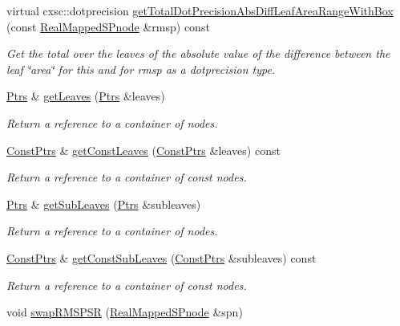 \begin{DoxyCompactItemize}
virtual cxsc\-::dotprecision \hyperlink{classsubpavings_1_1RealMappedSPnode_a74ba255a0781497c5dc76e8458969278}{get\-Total\-Dot\-Precision\-Abs\-Diff\-Leaf\-Area\-Range\-With\-Box} (const \hyperlink{classsubpavings_1_1RealMappedSPnode}{\-Real\-Mapped\-S\-Pnode} \&rmsp) const 
\begin{DoxyCompactList}\small\item\em \-Get the total over the leaves of the absolute value of the difference between the leaf \char`\"{}area\char`\"{} for this and for {\itshape rmsp\/} as a dotprecision type. \end{DoxyCompactList}\item 
\hyperlink{classsubpavings_1_1RealMappedSPnode_a9591975c77c7e7da92bbdcdf62a74d1a}{\-Ptrs} \& \hyperlink{classsubpavings_1_1RealMappedSPnode_a866601879aed0044333a5f28a773f677}{get\-Leaves} (\hyperlink{classsubpavings_1_1RealMappedSPnode_a9591975c77c7e7da92bbdcdf62a74d1a}{\-Ptrs} \&leaves)
\begin{DoxyCompactList}\small\item\em \-Return a reference to a container of nodes. \end{DoxyCompactList}\item 
\hyperlink{classsubpavings_1_1RealMappedSPnode_a5fc20ec0cd33f031e874f50251156e65}{\-Const\-Ptrs} \& \hyperlink{classsubpavings_1_1RealMappedSPnode_aea6a4c6aa2fe8eb944000db6790f9d8c}{get\-Const\-Leaves} (\hyperlink{classsubpavings_1_1RealMappedSPnode_a5fc20ec0cd33f031e874f50251156e65}{\-Const\-Ptrs} \&leaves) const 
\begin{DoxyCompactList}\small\item\em \-Return a reference to a container of const nodes. \end{DoxyCompactList}\item 
\hyperlink{classsubpavings_1_1RealMappedSPnode_a9591975c77c7e7da92bbdcdf62a74d1a}{\-Ptrs} \& \hyperlink{classsubpavings_1_1RealMappedSPnode_a561d20d602eafff9592fdd0ee912ffcc}{get\-Sub\-Leaves} (\hyperlink{classsubpavings_1_1RealMappedSPnode_a9591975c77c7e7da92bbdcdf62a74d1a}{\-Ptrs} \&subleaves)
\begin{DoxyCompactList}\small\item\em \-Return a reference to a container of nodes. \end{DoxyCompactList}\item 
\hyperlink{classsubpavings_1_1RealMappedSPnode_a5fc20ec0cd33f031e874f50251156e65}{\-Const\-Ptrs} \& \hyperlink{classsubpavings_1_1RealMappedSPnode_ac6e092c4b19b8747f154eefd56d3e864}{get\-Const\-Sub\-Leaves} (\hyperlink{classsubpavings_1_1RealMappedSPnode_a5fc20ec0cd33f031e874f50251156e65}{\-Const\-Ptrs} \&subleaves) const 
\begin{DoxyCompactList}\small\item\em \-Return a reference to a container of const nodes. \end{DoxyCompactList}\item 
void \hyperlink{classsubpavings_1_1RealMappedSPnode_af2612c2a420a9f91c8bca09f0bb6ab42}{swap\-R\-M\-S\-P\-S\-R} (\hyperlink{classsubpavings_1_1RealMappedSPnode}{\-Real\-Mapped\-S\-Pnode} \&spn)
\end{DoxyCompactItemize}
